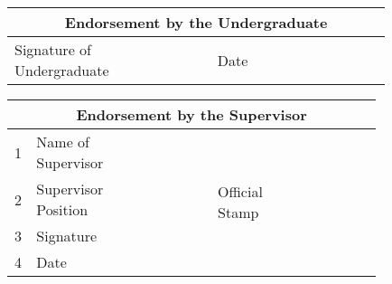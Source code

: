 \begin{center}
	\begin{tabular}{|m{0.29\linewidth}  |m{0.19\linewidth}  |m{0.05\linewidth}  |m{0.3\linewidth}  |}
		\hline 
		\multicolumn{4}{|c|}{\textbf{Endorsement by the Undergraduate}}\\ \hline
		Signature of Undergraduate && Date&\\[5mm]\hline		
	\end{tabular}
\end{center}

\begin{center}
	\begin{tabular}{|m{0.03\linewidth}  |m{0.24\linewidth}|  m{0.24\linewidth}|m{0.02\linewidth}|m{0.28\linewidth}|}
		\hline 
		\multicolumn{5}{|c|}{\textbf{Endorsement by the Supervisor}}\\ \hline
		1 & Name of Supervisor & & \multirow{4}{*}{\begin{sideways} Official Stamp \end{sideways}}& \multirow{4}{*}{}\\[2.5mm]
		 
		2 & Supervisor Position & & & \\[2.5mm] 
		3 & Signature & &&  \\[2.5mm] 
		4 & Date & && \\[2.5mm] \hline
	\end{tabular}
\end{center}